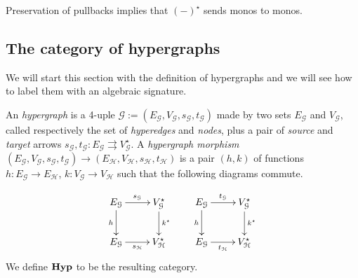 \documentclass[runningheads,envcountsect]{lipics-v2021}
\newcommand{\catname}[1]{\textbf{\textup{#1}}}
\newcommand{\hyp}{\catname{Hyp}}
\begin{document}
\begin{remark}\label{rem:mono}
	Preservation of pullbacks implies that $(-)^\star$ sends monos to monos.
\end{remark}


\subsection{The category of hypergraphs}

We will start this section with the definition of hypergraphs and we will see how to label them with an algebraic signature.  


\begin{definition}An \emph{hypergraph} is a 4-uple $\mathcal{G}:=(E_\mathcal{G}, V_\mathcal{G}, s_\mathcal{G}, t_\mathcal{G})$ made by two sets $E_\mathcal{G}$ and $V_\mathcal{G}$, called respectively the set of \emph{hyperedges} and \emph{nodes}, plus a pair of \emph{source} and \emph{target} arrows  $s_\mathcal{G}, t_\mathcal{G}\colon E_\mathcal{G}\rightrightarrows V_\mathcal{G}^\star$. A \emph{hypergraph morphism} $(E_\mathcal{G}, V_\mathcal{G}, s_\mathcal{G}, t_\mathcal{G})\to (E_\mathcal{H}, V_\mathcal{H}, s_\mathcal{H}, t_\mathcal{H})$ is a pair $(h,k)$ of functions $h\colon E_\mathcal{G}\to E_\mathcal{H}$, $k\colon V_\mathcal{G}\to V_\mathcal{H}$ such that the following diagrams commute.
	
	\[\xymatrix{ E_{\mathcal{G}} \ar[d]_{h} \ar[r]^{s_{\mathcal{G}}}& V^\star_{\mathcal{G}}  \ar[d]^{k^\star}& E_{\mathcal{G}} \ar[r]^{t_{\mathcal{G}}} \ar[d]_{h} & V^\star_{\mathcal{G}} \ar[d]^{k^\star}  \\ E_{\mathcal{G}} \ar[r]_{s_{\mathcal{H}}} & V^\star_{\mathcal{H}} & E_{\mathcal{G}} \ar[r]_{t_{\mathcal{H}}} & V^\star_{\mathcal{H}} }\]
	We define $\hyp$ to be the resulting category.
\end{definition}
\end{document}
